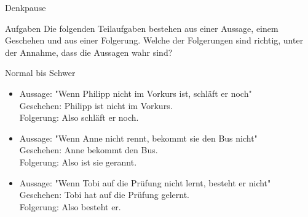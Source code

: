 {
\begin{frame}{Denkpause}
	\begin{alertblock}{Aufgaben}
		Die folgenden Teilaufgaben bestehen aus einer Aussage, einem Geschehen und aus einer Folgerung. Welche der Folgerungen sind richtig, unter der Annahme,
		dass die Aussagen wahr sind?
	\end{alertblock}
	\begin{block}{Normal bis Schwer}
		\begin{itemize}
			\item Aussage: "Wenn Philipp nicht im Vorkurs ist, schläft er noch"\\
			      Geschehen: Philipp ist nicht im Vorkurs.\\
			      Folgerung: Also schläft er noch.
			\item Aussage: "Wenn Anne nicht rennt, bekommt sie den Bus nicht"\\
			      Geschehen: Anne bekommt den Bus.\\
			      Folgerung: Also ist sie gerannt.
			\item Aussage: "Wenn Tobi auf die Prüfung nicht lernt, besteht er nicht"\\
			      Geschehen: Tobi hat auf die Prüfung gelernt.\\
			      Folgerung: Also besteht er.
		\end{itemize}
	\end{block}
\end{frame}
}


